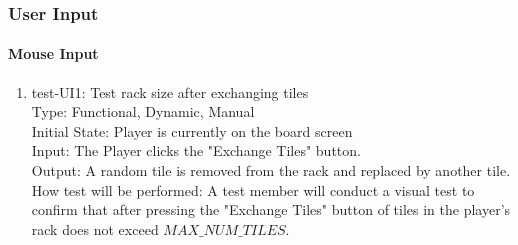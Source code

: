 \documentclass[12pt, titlepage]{article}
\begin{document}
\subsubsection{User Input}

\paragraph{Mouse Input}

\begin{enumerate}
\item{test-UI1: Test rack size after exchanging tiles \\} %
    Type: Functional, Dynamic, Manual\\
    Initial State: Player is currently on the board screen\\
    Input: The Player clicks the "Exchange Tiles" button.\\
    Output: A random tile is removed from the rack and replaced by another tile.\\
    How test will be performed: A test member will conduct a visual test to confirm that after pressing the "Exchange Tiles" button of tiles in the player's rack does not exceed $MAX\_NUM\_TILES$.

\end{enumerate}
\end{document}
